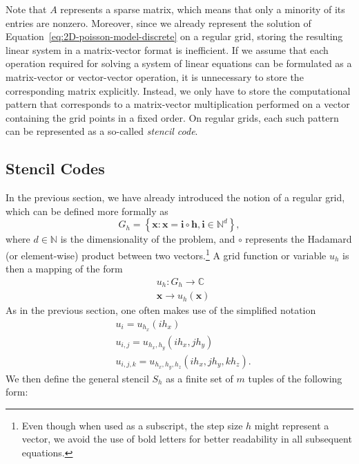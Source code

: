 Note that $A$ represents a sparse matrix, which means that only a minority of its entries are nonzero.
Moreover, since we already represent the solution of Equation~\eqref{eq:2D-poisson-model-discrete} on a regular grid, storing the resulting linear system in a matrix-vector format is inefficient.
If we assume that each operation required for solving a system of linear equations can be formulated as a matrix-vector or vector-vector operation, it is unnecessary to store the corresponding matrix explicitly.
Instead, we only have to store the computational pattern that corresponds to a matrix-vector multiplication performed on a vector containing the grid points in a fixed order.
On regular grids, each such pattern can be represented as a so-called \emph{stencil code}.

\subsection{Stencil Codes}
\label{subsec:stencil-codes}
In the previous section, we have already introduced the notion of a regular grid, which can be defined more formally as
\begin{equation}
	G_{h} = \left\{ \bm{x} : \bm{x} = \bm{i} \circ \bm{h}, \bm{i} \in \mathbb{N}^d \right\},
\end{equation}
where $d \in \mathbb{N}$ is the dimensionality of the problem, and $\circ$ represents the Hadamard (or element-wise) product between two vectors.\footnote{Even though when used as a subscript, the step size $h$ might represent a vector, we avoid the use of bold letters for better readability in all subsequent equations.}
A grid function or variable $u_h$ is then a mapping of the form
\begin{equation}
	\begin{split}
		& u_h : G_{h}\to \mathbb{C} \\
		& \bm{x} \to u_h(\bm{x})
	\end{split}
\end{equation}
As in the previous section, one often makes use of the simplified notation
\begin{equation}
	\begin{split}
		 & u_i = u_{h_x}(i h_x) \\
		& u_{i,j} = u_{h_x, h_y}(i h_x, j h_y) \\
		& u_{i,j,k} = u_{h_x, h_y, h_z}(i h_x, j h_y, k h_z).
	\end{split}
\end{equation}
We then define the general stencil $S_h$ as a finite set of $m$ tuples of the following form:

